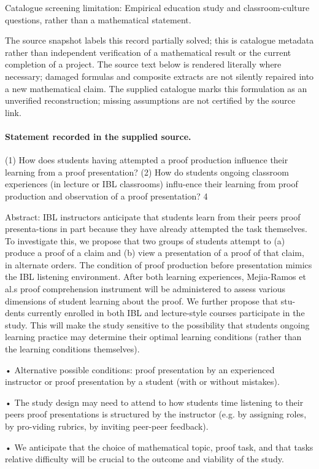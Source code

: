 \documentclass[11pt]{article}
\begin{document}
Catalogue screening limitation: Empirical education study and classroom-culture questions, rather than a mathematical statement.

The source snapshot labels this record partially solved; this is catalogue metadata rather than independent verification of a mathematical result or the current completion of a project.
The source text below is rendered literally where necessary; damaged formulas and composite extracts are not silently repaired into a new mathematical claim.
The supplied catalogue marks this formulation as an unverified reconstruction; missing assumptions are not certified by the source link.
\paragraph{Statement recorded in the supplied source.}
(1) How does students having attempted a proof production influence their learning from a proof presentation? (2) How do students ongoing classroom experiences (in lecture or IBL classrooms) influ-ence their learning from proof production and observation of a proof presentation? 4

Abstract: IBL instructors anticipate that students learn from their peers proof presenta-tions in part because they have already attempted the task themselves. To investigate this, we propose that two groups of students attempt to (a) produce a proof of a claim and (b) view a presentation of a proof of that claim, in alternate orders. The condition of proof production before presentation mimics the IBL listening environment. After both learning experiences, Mejia-Ramos et al.s proof comprehension instrument will be administered to assess various dimensions of student learning about the proof. We further propose that stu-dents currently enrolled in both IBL and lecture-style courses participate in the study. This will make the study sensitive to the possibility that students ongoing learning practice may determine their optimal learning conditions (rather than the learning conditions themselves).

• Alternative possible conditions: proof presentation by an experienced instructor or proof presentation by a student (with or without mistakes).

• The study design may need to attend to how students time listening to their peers proof presentations is structured by the instructor (e.g. by assigning roles, by pro-viding rubrics, by inviting peer-peer feedback).

• We anticipate that the choice of mathematical topic, proof task, and that tasks relative difficulty will be crucial to the outcome and viability of the study.
\end{document}
